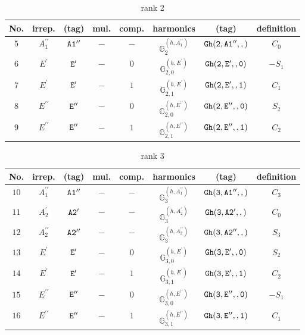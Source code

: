 \documentclass[fleqn,8pt]{jsarticle}
\begin{document}
\begin{table}[ht!]
\begin{center}
\caption{rank 2}
\renewcommand{\arraystretch}{1.3}
\begin{tabular}{cccccccc} \hline \hline
No. & irrep. & (tag) & mul. & comp. & harmonics & (tag) & definition \\ \hline
$ 5 $ & $ A_{1}^{\prime\prime} $ & $ {\tt A1''} $ & $ - $ & $ - $ & $ \mathbb{G}_{2}^{(h,A_{1}^{\prime\prime})} $ & $ {\tt Gh(2,A1'',,)} $ & $ C_{0} $ \\
$ 6 $ & $ E^{\prime} $ & $ {\tt E'} $ & $ - $ & $ 0 $ & $ \mathbb{G}_{2,0}^{(h,E^{\prime})} $ & $ {\tt Gh(2,E',,0)} $ & $ - S_{1} $ \\
$ 7 $ & $ E^{\prime} $ & $ {\tt E'} $ & $ - $ & $ 1 $ & $ \mathbb{G}_{2,1}^{(h,E^{\prime})} $ & $ {\tt Gh(2,E',,1)} $ & $ C_{1} $ \\
$ 8 $ & $ E^{\prime\prime} $ & $ {\tt E''} $ & $ - $ & $ 0 $ & $ \mathbb{G}_{2,0}^{(h,E^{\prime\prime})} $ & $ {\tt Gh(2,E'',,0)} $ & $ S_{2} $ \\
$ 9 $ & $ E^{\prime\prime} $ & $ {\tt E''} $ & $ - $ & $ 1 $ & $ \mathbb{G}_{2,1}^{(h,E^{\prime\prime})} $ & $ {\tt Gh(2,E'',,1)} $ & $ C_{2} $ \\
 \hline \hline
\end{tabular}
\end{center}
\end{table}
\begin{table}[ht!]
\begin{center}
\caption{rank 3}
\renewcommand{\arraystretch}{1.3}
\begin{tabular}{cccccccc} \hline \hline
No. & irrep. & (tag) & mul. & comp. & harmonics & (tag) & definition \\ \hline
$ 10 $ & $ A_{1}^{\prime\prime} $ & $ {\tt A1''} $ & $ - $ & $ - $ & $ \mathbb{G}_{3}^{(h,A_{1}^{\prime\prime})} $ & $ {\tt Gh(3,A1'',,)} $ & $ C_{3} $ \\
$ 11 $ & $ A_{2}^{\prime} $ & $ {\tt A2'} $ & $ - $ & $ - $ & $ \mathbb{G}_{3}^{(h,A_{2}^{\prime})} $ & $ {\tt Gh(3,A2',,)} $ & $ C_{0} $ \\
$ 12 $ & $ A_{2}^{\prime\prime} $ & $ {\tt A2''} $ & $ - $ & $ - $ & $ \mathbb{G}_{3}^{(h,A_{2}^{\prime\prime})} $ & $ {\tt Gh(3,A2'',,)} $ & $ S_{3} $ \\
$ 13 $ & $ E^{\prime} $ & $ {\tt E'} $ & $ - $ & $ 0 $ & $ \mathbb{G}_{3,0}^{(h,E^{\prime})} $ & $ {\tt Gh(3,E',,0)} $ & $ S_{2} $ \\
$ 14 $ & $ E^{\prime} $ & $ {\tt E'} $ & $ - $ & $ 1 $ & $ \mathbb{G}_{3,1}^{(h,E^{\prime})} $ & $ {\tt Gh(3,E',,1)} $ & $ C_{2} $ \\
$ 15 $ & $ E^{\prime\prime} $ & $ {\tt E''} $ & $ - $ & $ 0 $ & $ \mathbb{G}_{3,0}^{(h,E^{\prime\prime})} $ & $ {\tt Gh(3,E'',,0)} $ & $ - S_{1} $ \\
$ 16 $ & $ E^{\prime\prime} $ & $ {\tt E''} $ & $ - $ & $ 1 $ & $ \mathbb{G}_{3,1}^{(h,E^{\prime\prime})} $ & $ {\tt Gh(3,E'',,1)} $ & $ C_{1} $ \\
 \hline \hline
\end{tabular}
\end{center}
\end{table}
\end{document}
